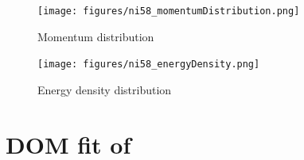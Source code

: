 \begin{figure}[H]
    \centering
    \texttt{[image: figures/ni58\_momentumDistribution.png]}
    \caption{Momentum distribution}
    \label{DOMFitData_ni58_momentumDistribution}
\end{figure}

\begin{figure}[H]
    \centering
    \texttt{[image: figures/ni58\_energyDensity.png]}
    \caption{Energy density distribution}
    \label{DOMFitData_ni58_energyDensity}
\end{figure}

\section{DOM fit of \niFour}

\label{ni64DOMOutput}
